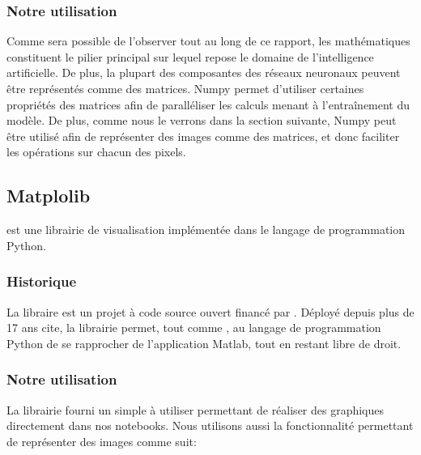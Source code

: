 \documentclass[letterpaper,10pt,french]{sphinxmanual}
\begin{document}
\subsubsection{Notre utilisation}
\label{\detokenize{explications_librairies:id7}}
Comme sera possible de l’observer tout au long de ce rapport, les mathématiques constituent le pilier principal sur lequel repose le domaine de l’intelligence artificielle. De plus, la plupart des composantes des réseaux neuronaux peuvent être représentés comme des matrices. Numpy permet d’utiliser certaines propriétés des matrices afin de paralléliser les calculs menant à l’entraînement du modèle.  De plus,  comme nous le verrons dans la section suivante, Numpy peut être utilisé afin de représenter des images comme des matrices, et donc faciliter les opérations sur chacun des pixels.


\subsection{Matplolib}
\label{\detokenize{explications_librairies:matplolib}}
 est une librairie de visualisation implémentée dans le langage de programmation Python.


\subsubsection{Historique}
\label{\detokenize{explications_librairies:id8}}
La libraire est un projet à code source ouvert financé par . Déployé depuis plus de 17 ans cite,  la librairie permet, tout comme , au langage de programmation Python de se rapprocher de l’application Matlab, tout en restant libre de droit.


\subsubsection{Notre utilisation}
\label{\detokenize{explications_librairies:id9}}
La librairie fourni un  simple à utiliser permettant de réaliser des graphiques directement dans nos notebooks. Nous utilisons aussi la fonctionnalité permettant de représenter des images comme suit:

\begin{sphinxVerbatim}[commandchars=\\\{\}]
\PYG{p}{[}\PYG{p}{]}
\end{sphinxVerbatim}
\end{document}
